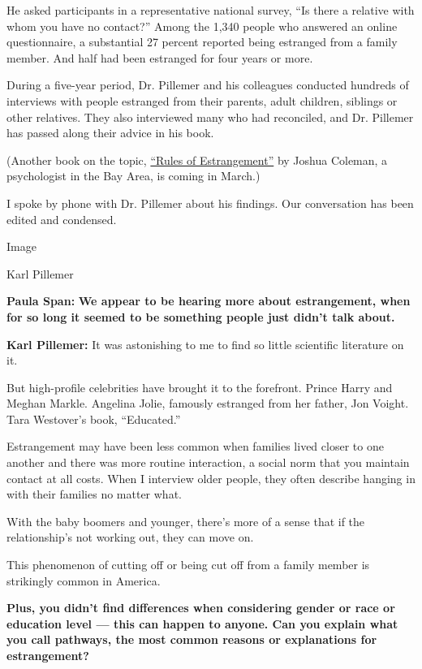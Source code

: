 He asked participants in a representative national survey, ``Is there a
relative with whom you have no contact?'' Among the 1,340 people who
answered an online questionnaire, a substantial 27 percent reported
being estranged from a family member. And half had been estranged for
four years or more.

During a five-year period, Dr. Pillemer and his colleagues conducted
hundreds of interviews with people estranged from their parents, adult
children, siblings or other relatives. They also interviewed many who
had reconciled, and Dr. Pillemer has passed along their advice in his
book.

(Another book on the topic,
\href{https://www.penguinrandomhouse.com/books/622584/rules-of-estrangement-by-joshua-coleman-phd/}{``Rules
of Estrangement''} by Joshua Coleman, a psychologist in the Bay Area, is
coming in March.)

I spoke by phone with Dr. Pillemer about his findings. Our conversation
has been edited and condensed.

Image

Karl Pillemer

\textbf{Paula Span:} \textbf{We appear to be hearing more about
estrangement, when for so long it seemed to be something people just
didn't talk about.}

\textbf{Karl Pillemer:} It was astonishing to me to find so little
scientific literature on it.

But high-profile celebrities have brought it to the forefront. Prince
Harry and Meghan Markle. Angelina Jolie, famously estranged from her
father, Jon Voight. Tara Westover's book, ``Educated.''

Estrangement may have been less common when families lived closer to one
another and there was more routine interaction, a social norm that you
maintain contact at all costs. When I interview older people, they often
describe hanging in with their families no matter what.

With the baby boomers and younger, there's more of a sense that if the
relationship's not working out, they can move on.

This phenomenon of cutting off or being cut off from a family member is
strikingly common in America.

\textbf{Plus, you didn't find differences when considering gender or
race or education level --- this can happen to anyone. Can you explain
what you call pathways, the most common reasons or explanations for
estrangement?}

